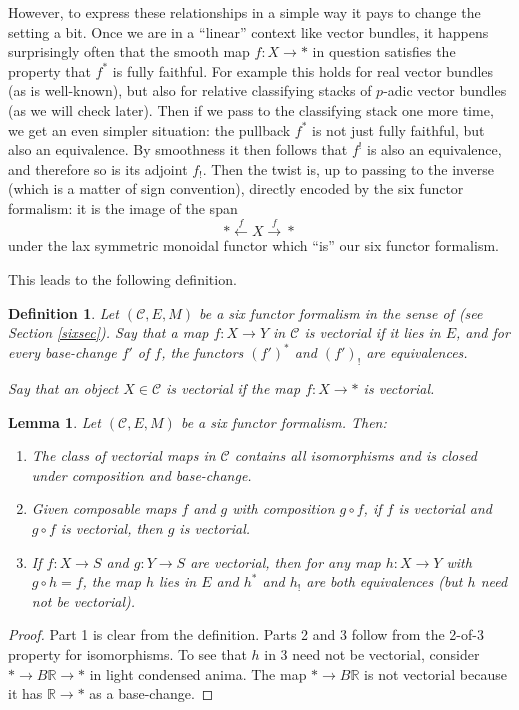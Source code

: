 \documentclass[12pt]{article}
\newtheorem{lemma}[theorem]{Lemma}
\newtheorem{definition}[theorem]{Definition}
\newcommand{\mc}{\mathcal}
\newcommand{\mbb}{\mathbb}
\begin{document}
However, to express these relationships in a simple way it pays to change the setting a bit.  Once we are in a ``linear'' context like vector bundles, it happens surprisingly often that the smooth map $f:X\to \ast$ in question satisfies the property that $f^\ast$ is fully faithful.  For example this holds for real vector bundles (as is well-known), but also for relative classifying stacks of $p$-adic vector bundles (as we will check later).  Then if we pass to the classifying stack one more time, we get an even simpler situation: the pullback $f^\ast$ is not just fully faithful, but also an equivalence.  By smoothness it then follows that $f^!$ is also an equivalence, and therefore so is its adjoint $f_!$.  Then the twist is, up to passing to the inverse (which is a matter of sign convention), directly encoded by the six functor formalism: it is the image of the span
$$\ast \overset{f}{\leftarrow} X \overset{f}{\rightarrow} \ast$$
under the lax symmetric monoidal functor which ``is'' our six functor formalism.

This leads to the following definition.

\begin{definition}
Let $(\mathcal{C},E,M)$ be a six functor formalism in the sense of \cite{HeyerSixFunctors} (see Section \ref{sixsec}).  Say that a map $f:X\to Y$ in $\mc{C}$ is \emph{vectorial} if it lies in $E$, and for every base-change $f'$ of $f$, the functors $(f')^\ast$ and $(f')_!$ are equivalences.

Say that an object $X\in\mc{C}$ is \emph{vectorial} if the map $f:X\to \ast$ is vectorial.
\end{definition}

\begin{lemma}\label{vectorialproperties}
Let $(\mc{C},E,M)$ be a six functor formalism.  Then:
\begin{enumerate}
\item The class of vectorial maps in $\mc{C}$ contains all isomorphisms and is closed under composition and base-change.
\item Given composable maps $f$ and $g$ with composition $g\circ f$, if $f$ is vectorial and $g\circ f$ is vectorial, then $g$ is vectorial.
\item If $f:X\to S$ and $g:Y\to S$ are vectorial, then for any map $h:X\to Y$ with $g\circ h = f$, the map $h$ lies in $E$ and $h^\ast$ and $h_!$ are both equivalences (but $h$ need not be vectorial).
\end{enumerate}
\end{lemma}
\begin{proof}
Part 1 is clear from the definition.  Parts 2 and 3 follow from the 2-of-3 property for isomorphisms.  To see that $h$ in 3 need not be vectorial, consider $\ast \to B\mathbb{R} \to \ast$ in light condensed anima.  The map $\ast \to B\mathbb{R}$ is not vectorial because it has $\mbb{R}\to\ast$ as a base-change.
\end{proof}
\end{document}
